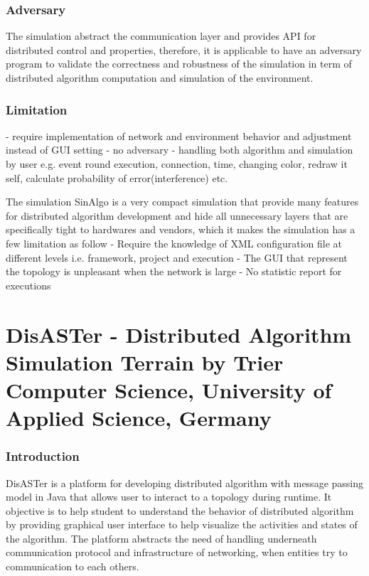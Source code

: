 \subsubsection{Adversary}
The simulation abstract the communication layer and provides API for distributed control and properties, therefore, it is applicable to have an adversary program to validate the correctness and robustness of the simulation in term of distributed algorithm computation and simulation of the environment.

\subsubsection{Limitation}
- require implementation of network and environment behavior and adjustment instead of GUI setting
- no adversary
- handling both algorithm and simulation by user e.g. event round execution, connection, time, changing color, redraw it self, calculate probability of error(interference) etc.



The simulation SinAlgo is a very compact simulation that provide many features for distributed algorithm development and hide all unnecessary layers that are specifically tight to hardwares and vendors, which it makes the simulation has a few limitation as follow
- Require the knowledge of XML configuration file at different levels i.e. framework, project and execution
- The GUI that represent the topology is unpleasant when the network is large
- No statistic report for executions












\section{DisASTer - Distributed Algorithm Simulation Terrain by Trier Computer Science, University of Applied Science, Germany}
\subsubsection{Introduction}
DisASTer is a platform for developing distributed algorithm with message passing model in Java that allows user to interact to a topology during runtime. It objective is to help student to understand the behavior of distributed algorithm by providing graphical user interface to help visualize the activities and states of the algorithm. The platform abstracts the need of handling underneath communication protocol and infrastructure of networking, when entities try to communication to each others.

